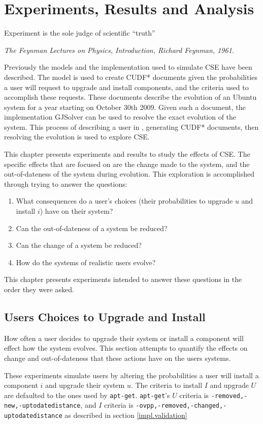 
\chapter{Experiments, Results and Analysis}
\label{experiments}
\epigraph{Experiment is the sole judge of scientific ``truth''}
{\textit{The Feynman Lectures on Physics, Introduction, Richard Feynman, 1961.}}
Previously the models and the implementation used to simulate CSE have been described.
The \usermodel model is used to create CUDF* documents given the probabilities a user will request to upgrade and install components, 
and the criteria used to accomplish these requests.
These documents describe the evolution of an Ubuntu system for a year starting on October 30th 2009.
Given such a document, the implementation GJSolver can be used to resolve the exact evolution of the system.
This process of describing a user in \usermodel, generating CUDF* documents, then resolving the evolution is used to explore CSE.

This chapter presents experiments and results to study the effects of CSE.
The specific effects that are focused on are the change made to the system, and the out-of-dateness of the system during evolution.
This exploration is accomplished through trying to answer the questions:
\begin{enumerate}
  \item What consequences do a user's choices (their probabilities to upgrade $u$ and install $i$) have on their system?
  \item Can the out-of-dateness of a system be reduced?
  \item Can the change of a system be reduced?
  \item How do the systems of realistic users evolve?
\end{enumerate}
This chapter presents experiments intended to answer these questions in the order they were asked. 

\section{Users Choices to Upgrade and Install}
\label{exp.q1}
How often a user decides to upgrade their system or install a component will effect how the system evolves.
This section attempts to quantify the effects on change and out-of-dateness that these actions have on the users systems.

These experiments simulate users by altering the probabilities a user will install a component $i$ and upgrade their system $u$.
The criteria to install $I$ and upgrade $U$ are defaulted to the ones used by \texttt{apt-get}. 
\texttt{apt-get}'s $U$ criteria is \texttt{-removed,-new,-uptodatedistance}, and $I$ criteria is \texttt{-ovpp,-removed,-changed,-uptodatedistance} as described in section \ref{impl.validation} 

